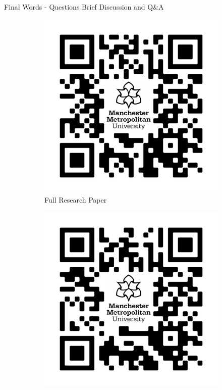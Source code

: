 \documentclass[aspectratio=169]{beamer}
\begin{document}
\begin{frame}{Final Words - Questions}
    Brief Discussion and Q\&A
    \begin{figure}
        \centering
        \begin{subfigure}[t]{0.3\textwidth}
            \centering
            \includegraphics[width=\linewidth]{assets/.Global/PAPER QRCODE.png}
            \caption{Full Research Paper}
            \label{fig:fw-qr1}
        \end{subfigure}
        \begin{subfigure}[t]{0.3\textwidth}
            \centering
            \includegraphics[width=\linewidth]{assets/.Global/SLIDES QRCODE.png}

\end{subfigure}
\end{figure}
\end{frame}
\end{document}
